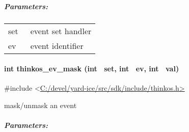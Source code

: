 {\subparagraph{\texorpdfstring{{Parameters:}}{Parameters:}}\label{parameters-30}

\protect\hypertarget{t.edc44c26eda9f56c94bb61cc6c572ae53f165af7}{}{}\protect\hypertarget{t.30}{}{}

\begin{longtable}[]{@{}ll@{}}
\toprule
\begin{minipage}[t]{0.47\columnwidth}\raggedright\strut
{set}{~}\strut
\end{minipage} & \begin{minipage}[t]{0.47\columnwidth}\raggedright\strut
{event set handler }\strut
\end{minipage}\tabularnewline
\begin{minipage}[t]{0.47\columnwidth}\raggedright\strut
{ev}{~}\strut
\end{minipage} & \begin{minipage}[t]{0.47\columnwidth}\raggedright\strut
{event identifier }\strut
\end{minipage}\tabularnewline
\bottomrule
\end{longtable}

\paragraph{\texorpdfstring{{int thinkos\_ev\_mask (int ~set, int ~ev,
int
~val)}}{int thinkos\_ev\_mask (int ~set, int ~ev, int ~val)}}\label{int-thinkos_ev_mask-int-set-int-ev-int-val}

{}

{\#include
\textless{}}{\protect\hyperlink{h.pkwqa1}{C:/devel/yard-ice/src/sdk/include/thinkos.h}}{\protect\hyperlink{h.pkwqa1}{\textgreater{}}}

{mask/unmask an event }

{}

\subparagraph{\texorpdfstring{{Parameters:}}{Parameters:}}\label{parameters-31}

\protect\hypertarget{t.067f774366820f43dbfd2abca19aca2a5f35fd2e}{}{}\protect\hypertarget{t.31}{}{}

}
